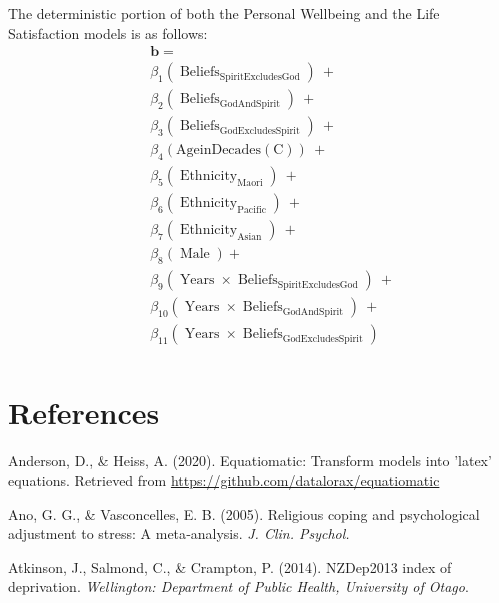 \documentclass[
  english,
  man,floatsintext]{apa6}
\begin{document}
The deterministic portion of both the Personal Wellbeing and the Life Satisfaction models is as follows:
\[
\begin{aligned}
& \quad  \boldsymbol{b} = \\
& \quad \beta_{1}(\operatorname{Beliefs}_{\operatorname{SpiritExcludesGod}})\ + \\
&\quad \beta_{2}(\operatorname{Beliefs}_{\operatorname{GodAndSpirit}})\  + \\
& \quad  \beta_{3}(\operatorname{Beliefs}_{\operatorname{GodExcludesSpirit}})\ +\\
&\quad \beta_{4}(\operatorname{Age in Decades (C)})\  +\\ 
& \quad  \beta_{5}(\operatorname{Ethnicity}_{\operatorname{Maori}})\ +\\
&\quad \beta_{6}(\operatorname{Ethnicity}_{\operatorname{Pacific}})\ +  \\ 
& \quad  \beta_{7}(\operatorname{Ethnicity}_{\operatorname{Asian}})\ +\\
& \quad \beta_{8}(\operatorname{Male} )+ \\ 
& \quad \beta_{9}(\operatorname{Years} \times \operatorname{Beliefs}_{\operatorname{SpiritExcludesGod}})\ + \\ 
& \quad \beta_{10}(\operatorname{Years} \times \operatorname{Beliefs}_{\operatorname{GodAndSpirit}})\ + \\
&\quad \beta_{11}(\operatorname{Years} \times \operatorname{Beliefs}_{\operatorname{GodExcludesSpirit}}) \\ 
\end{aligned}
\]
\newpage

\hypertarget{references}{%
\section{References}\label{references}}

\begingroup
\setlength{\parindent}{-0.5in}
\setlength{\leftskip}{0.5in}

\hypertarget{refs}{}
\leavevmode\hypertarget{ref-R-equatiomatic}{}%
Anderson, D., \& Heiss, A. (2020). Equatiomatic: Transform models into 'latex' equations. Retrieved from \url{https://github.com/datalorax/equatiomatic}

\leavevmode\hypertarget{ref-Ano2005-hx}{}%
Ano, G. G., \& Vasconcelles, E. B. (2005). Religious coping and psychological adjustment to stress: A meta‐analysis. \emph{J. Clin. Psychol.}

\leavevmode\hypertarget{ref-Atkinson2014-ex}{}%
Atkinson, J., Salmond, C., \& Crampton, P. (2014). NZDep2013 index of deprivation. \emph{Wellington: Department of Public Health, University of Otago}.
\end{document}
